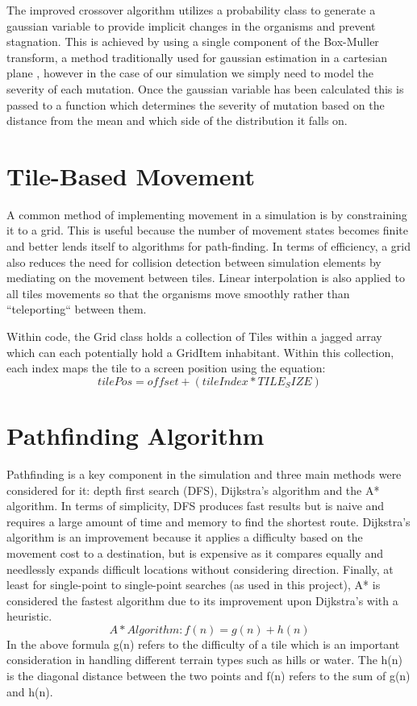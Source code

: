 \documentclass[a4paper, oneside, 11pt]{report}
\begin{document}
The improved crossover algorithm utilizes a probability class to generate a gaussian variable to provide implicit changes in the organisms and prevent stagnation. This is achieved by using a single component of the Box-Muller transform, a method traditionally used for gaussian estimation in a cartesian plane \cite{box1958note}, however in the case of our simulation we simply need to model the severity of each mutation. Once the gaussian variable has been calculated this is passed to a function which determines the severity of mutation based on the distance from the mean and which side of the distribution it falls on.

\section{Tile-Based Movement}\label{grid}
A common method of implementing movement in a simulation is by constraining it to a grid. This is useful because the number of movement states becomes finite and better lends itself to algorithms for path-finding. In terms of efficiency, a grid also reduces the need for collision detection between simulation elements by mediating on the movement between tiles. Linear interpolation is also applied to all tiles movements so that the organisms move smoothly rather than ``teleporting`` between them.

Within code, the Grid class holds a collection of Tiles within a jagged array which can each potentially hold a GridItem inhabitant. Within this collection, each index maps the tile to a screen position using the equation:
\[tilePos = offset + (tileIndex * TILE_SIZE)\]

\section{Pathfinding Algorithm}\label{pathfinding}
Pathfinding is a key component in the simulation and three main methods were considered for it: depth first search (DFS), Dijkstra's algorithm and the A* algorithm. In terms of simplicity, DFS produces fast results but is naive and requires a large amount of time and memory to find the shortest route. Dijkstra's algorithm is an improvement because it applies a difficulty based on the movement cost to a destination, but is expensive as it compares equally and needlessly expands difficult locations without considering direction. Finally, at least for single-point to single-point searches (as used in this project), A* is considered the fastest algorithm \cite{belwariar} due to its improvement upon Dijkstra's with a heuristic. 
\[A* Algorithm: f(n) = g(n) + h(n)\]
In the above formula g(n) refers to the difficulty of a tile which is an important consideration in handling different terrain types such as hills or water. The h(n) is the diagonal distance between the two points and f(n) refers to the sum of g(n) and h(n).
\end{document}

